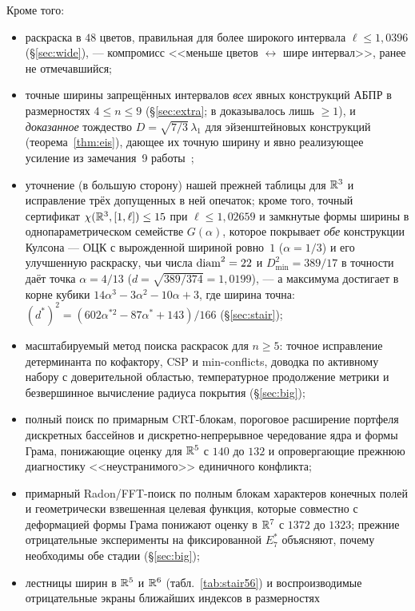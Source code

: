 \noindent Кроме того:
\begin{itemize}[leftmargin=1.4em,itemsep=1pt]
\item раскраска в $48$ цветов, правильная для более широкого интервала
$\ell\le1{,}0396$ (\S\ref{sec:wide}), --- компромисс <<меньше цветов ${}\leftrightarrow{}$
шире интервал>>, ранее не отмечавшийся;
\item точные ширины запрещённых интервалов \emph{всех} явных конструкций АБПР в
размерностях $4\le n\le9$ (\S\ref{sec:extra}; в \cite{ABPR} доказывалось лишь
$\ge1$), и \emph{доказанное} тождество $D=\sqrt{7/3}\,\lambda_1$ для
эйзенштейновых конструкций (теорема~\ref{thm:eis}), дающее их точную ширину и
явно реализующее усиление из замечания~9 работы~\cite{ABPR};
\item уточнение (в большую сторону) нашей прежней таблицы \cite{Ivanov2011}
для $\mathbb{R}^3$ и исправление трёх допущенных в ней опечаток; кроме того, точный
сертификат $\chi(\mathbb{R}^3,[1,\ell])\le15$ при $\ell\le1{,}02659$ и замкнутые формы
ширины в однопараметрическом семействе $G(\alpha)$, которое покрывает
\emph{обе} конструкции Кулсона --- ОЦК с вырожденной шириной ровно~$1$
($\alpha=1/3$) и его улучшенную раскраску, чьи числа $\operatorname{diam}^2=22$ и
$D^2_{\min}=389/17$ в точности даёт точка $\alpha=4/13$
($d=\sqrt{389/374}=1{,}0199$), --- а максимума достигает в корне кубики
$14\alpha^3-3\alpha^2-10\alpha+3$, где ширина точна:
$(d^*)^2=(602\alpha^{*2}-87\alpha^*+143)/166$ (\S\ref{sec:stair});
\item масштабируемый метод поиска раскрасок для $n\ge5$: точное исправление
детерминанта по кофактору, CSP и min-conflicts, доводка по активному набору с доверительной областью, температурное продолжение метрики и безвершинное вычисление радиуса покрытия
(\S\ref{sec:big});
\item полный поиск по примарным CRT-блокам, пороговое расширение портфеля
дискретных бассейнов и дискретно-непрерывное чередование ядра и формы Грама,
понижающие оценку для $\mathbb{R}^5$ с $140$ до $132$ и опровергающие прежнюю
диагностику <<неустранимого>> единичного конфликта;
\item примарный Radon/FFT-поиск по полным блокам характеров конечных полей и
геометрически взвешенная целевая функция, которые совместно с деформацией формы
Грама понижают оценку в $\mathbb{R}^7$ с $1372$ до $1323$; прежние отрицательные
эксперименты на фиксированной $E_7^*$ объясняют, почему необходимы обе стадии
(\S\ref{sec:big});
\item лестницы ширин в $\mathbb{R}^5$ и $\mathbb{R}^6$ (табл.~\ref{tab:stair56}) и
воспроизводимые отрицательные экраны ближайших индексов в размерностях

\end{itemize}
